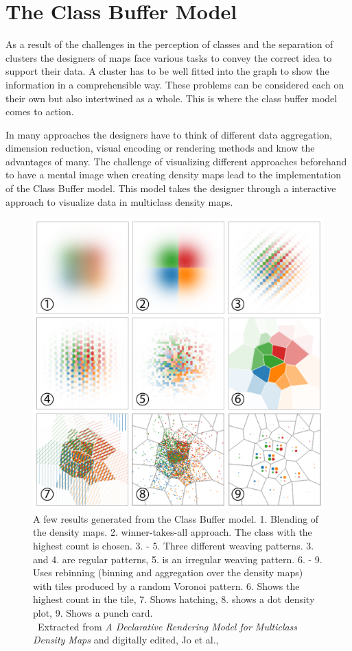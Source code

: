 \section{The Class Buffer Model}

As a result of the challenges in the perception of classes and the separation of clusters the designers of maps face various tasks to convey the correct idea to support their data. A cluster has to be well fitted into the graph to show the information in a comprehensible way. These problems can be considered each on their own but also intertwined as a whole. This is where the class buffer model comes to action.

In many approaches the designers have to think of different data aggregation, dimension reduction, visual encoding or rendering methods and know the advantages of many. The challenge of visualizing different approaches beforehand to have a mental image when creating density maps lead to the implementation of the Class Buffer model. This model takes the designer through a interactive approach to visualize data in multiclass density maps.

\begin{figure}
  \centering
	\includegraphics[width=\columnwidth]{./figures/results}
	\caption{A few results generated from the Class Buffer model. 1. Blending of the density maps. 2. winner-takes-all approach. The class with the highest count is chosen. 3. - 5. Three different weaving patterns. 3. and 4. are regular patterns, 5. is an irregular weaving pattern. 6. - 9. Uses rebinning (binning and aggregation over the density maps) with tiles produced by a random Voronoi pattern. 6. Shows the highest count in the tile, 7. Shows hatching, 8. shows a dot density plot, 9. Shows a punch card.\\\textcopyright~Extracted from \textit{A Declarative Rendering Model for Multiclass Density Maps} and digitally edited, Jo et al.,~\cite{jo2019declarative}}\label{fig:mdm-results}
\end{figure}

